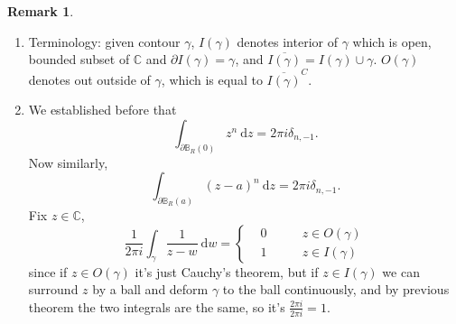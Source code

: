 \documentclass[a4paper]{article}
\theoremstyle{definition}
\newtheorem*{remark}{Remark}
\begin{document}
\begin{remark}
\begin{enumerate}
    \item Terminology: given contour $\gamma$, $I(\gamma)$ denotes interior of $\gamma$ which is open, bounded subset of $\mathbb C$ and $\partial I(\gamma) = \gamma$, and $\overline{I(\gamma)} = I(\gamma) \cup \gamma$. $O(\gamma)$ denotes out outside of $\gamma$, which is equal to $\overline{I(\gamma)}^C$.
    \item We established before that
    \[
    \int_{\partial \mathbb B_R(0)} z^n \ \mathrm d z = 2\pi i \delta_{n,-1}.
    \]
    Now similarly, 
    \[
    \int_{\partial \mathbb B_R(a)} (z-a)^n \ \mathrm d z = 2\pi i \delta_{n,-1}.
    \]
    Fix $z\in \mathbb C$,
    \[
    \frac{1}{2\pi i}\int_\gamma \frac{1}{z-w} \ \mathrm d w = \left\{ \begin{aligned}
       &0 \qquad &z\in O(\gamma)\\
       &1 \qquad &z\in I(\gamma)
    \end{aligned} \right.
    \]
    since if $z\in O(\gamma)$ it's just Cauchy's theorem, but if $z\in I(\gamma)$ we can surround $z$ by a ball and deform $\gamma$ to the ball continuously, and by previous theorem the two integrals are the same, so it's $\frac{2\pi i}{2\pi i} =1.$
\end{enumerate}
\end{remark}
\end{document}
